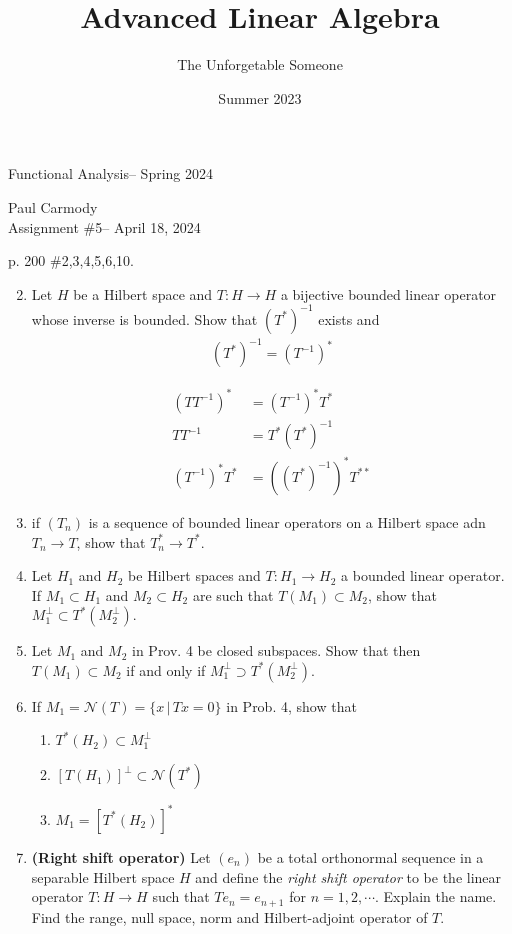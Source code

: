 \documentclass[10pt,a4paper]{report}
\title{Advanced Linear Algebra}
\author{The Unforgetable Someone}
\date{Summer 2023}
\newcommand{\CLASSNAME}{Functional Analysis}
\newcommand{\STUDENTNAME}{Paul Carmody}
\newcommand{\ASSIGNMENT}{Assignment \#5}
\newcommand{\DUEDATE}{April 18, 2024}
\newcommand{\SEMESTER}{Spring 2024}
\begin{document}
\begin{center}
	\Large{\CLASSNAME -- \SEMESTER} \\
\end{center}
\begin{center}
	\STUDENTNAME \\
	\ASSIGNMENT -- \DUEDATE\\
\end{center} 

p. 200 \#2,3,4,5,6,10. 
\begin{enumerate}
	\setcounter{enumi}{1}
	\item Let $H$ be a Hilbert space and $T: H \to H$ a bijective bounded linear operator whose inverse is bounded.  Show that $(T^*)^{-1}$ exists and 
	\begin{align*}
		(T^*)^{-1}=(T^{-1})^*
	\end{align*}
	
	\begin{align*}
		(TT^{-1})^* &= (T^{-1})^*T^*\\
		TT^{-1} &= T^*(T^*)^{-1} \\
		(T^{-1})^*T^* &= ((T^*)^{-1})^*T^{**}
	\end{align*}
	
	\item if $(T_n)$ is a sequence of bounded linear operators on a Hilbert space adn $T_n \to T$, show that $T_n^*\to T^*$.
	
	\item Let $H_1$ and $H_2$ be Hilbert spaces and $T: H_1 \to H_2$ a bounded linear operator.  If $M_1\subset H_1$ and $M_2 \subset H_2$ are such that $T(M_1) \subset M_2$, show that $M_1^\perp \subset T^*(M_2^\perp)$.
	
	\item Let $M_1$ and $M_2$ in Prov. 4 be closed subspaces.   Show that then $T(M_1)\subset M_2$ if and only if $M_1^\perp \supset T^*(M_2^\perp)$.
	
	\item If $M_1=\mathcal{N}(T)=\{x\,|\,Tx=0\}$ in Prob. 4, show that 
	\begin{enumerate}
		\item $T^*(H_2) \subset M_1^\perp$
		\item $[T(H_1)]^\perp \subset \mathcal{N}(T^*)$
		\item $M_1=[T^*(H_2)]^*$
	\end{enumerate}
	\setcounter{enumi}{9}
	\item \textbf{(Right shift operator)} Let $(e_n)$ be a total orthonormal sequence in a separable Hilbert space $H$ and define the \textit{right shift operator} to be the linear operator $T: H \to H$ such that $Te_n=e_{n+1}$ for $n=1,2,\cdots$.  Explain the name.  Find the range, null space, norm and Hilbert-adjoint operator of $T$.

\end{enumerate}
\end{document}

